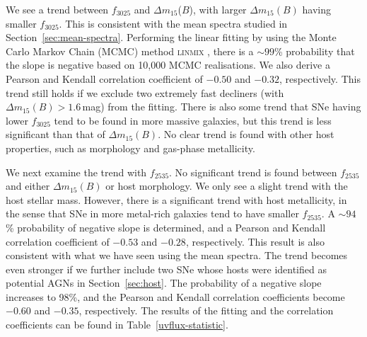 \documentclass[useAMS,usenatbib]{mn2e}
\newcommand{\deltam}{\ensuremath{\Delta m_{15}}}
\begin{document}
We see a trend between $f_{3025}$ and $\deltam$($B$), with larger $\deltam(B)$ having smaller $f_{3025}$. This is consistent with the mean spectra studied in Section~\ref{sec:mean-spectra}. Performing the linear fitting by using the Monte Carlo Markov Chain (MCMC) method \textsc{linmix} \citep{2007ApJ...665.1489K}, there is a $\sim99$\% probability that the slope is negative based on 10,000 MCMC realisations. We also derive a Pearson and Kendall correlation coefficient of $-0.50$ and $-0.32$, respectively. This trend still holds if we exclude two extremely fast decliners (with $\deltam(B)>1.6$\,mag) from the fitting. There is also some trend that SNe having lower $f_{3025}$ tend to be found in more massive galaxies, but this trend is less significant than that of $\deltam(B)$. No clear trend is found with other host properties, such as morphology and gas-phase metallicity. 

We next examine the trend with $f_{2535}$. No significant trend is found between $f_{2535}$ and either $\deltam(B)$ or host morphology. We only see a slight trend with the host stellar mass. However, there is a significant trend with host metallicity, in the sense that SNe in more metal-rich galaxies tend to have smaller $f_{2535}$. A $\sim94$\% probability of negative slope is determined, and a Pearson and Kendall correlation coefficient of $-0.53$ and $-0.28$, respectively. This result is also consistent with what we have seen using the mean spectra. The trend becomes even stronger if we further include two SNe whose hosts were identified as potential AGNs in Section~\ref{sec:host}. The probability of a negative slope increases to 98\%, and the Pearson and Kendall correlation coefficients become $-0.60$ and $-0.35$, respectively. The results of the fitting and the correlation coefficients can be found in Table~\ref{uvflux-statistic}.
\end{document}
